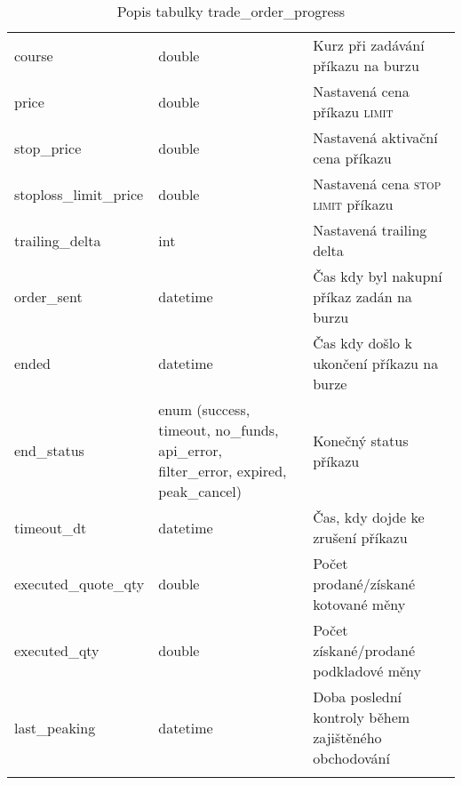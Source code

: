\begin{center}
\begin{longtable}[t]{|l|C{4cm}|p{4cm}|}
        course                      & double                                                                               & Kurz při zadávání příkazu na burzu                   \\
        price                       & double                                                                               & Nastavená cena příkazu \textsc{limit}                \\
        stop\_price                 & double                                                                               & Nastavená aktivační cena příkazu                     \\
        stoploss\_limit\_price      & double                                                                               & Nastavená cena \textsc{stop limit} příkazu           \\
        trailing\_delta             & int                                                                                  & Nastavená trailing delta                             \\
        order\_sent                 & datetime                                                                             & Čas kdy byl nakupní příkaz zadán na burzu            \\
        ended                       & datetime                                                                             & Čas kdy došlo k ukončení příkazu na burze            \\
        end\_status                 & enum (success, timeout, no\_funds, api\_error, filter\_error, expired, peak\_cancel) & Konečný status příkazu                               \\
        timeout\_dt                 & datetime                                                                             & Čas, kdy dojde ke zrušení příkazu                    \\
        executed\_quote\_qty        & double                                                                               & Počet prodané/získané kotované měny                  \\
        executed\_qty               & double                                                                               & Počet získané/prodané podkladové měny                \\
        last\_peaking               & datetime                                                                             & Doba poslední kontroly během zajištěného obchodování \\
        \hline
        \caption*{Popis tabulky trade\_order\_progress}
        \label{tab:tradeOrderProgress}
    \end{longtable}
\end{center}

